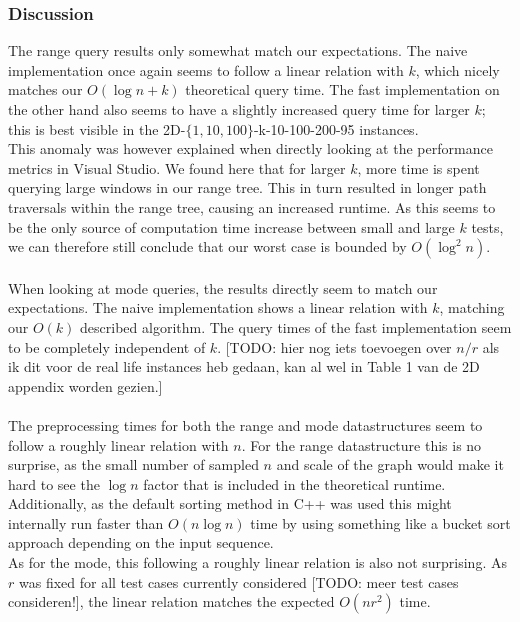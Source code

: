\documentclass{article}
\newcommand{\todo}[1]{{\color{red}[#1]}}
\newcommand{\fb}[1]{{\color{blue}#1}}
\begin{document}
\subsubsection*{Discussion}
The range query results only somewhat match our expectations. The naive implementation once again seems to follow a linear relation with $k$, which nicely matches our $O(\log n + k)$ theoretical query time. The fast implementation on the other hand also seems to have a slightly increased query time for larger $k$; \fb{this is best visible in the 2D-$\{1,10,100\}$-k-10-100-200-95 instances}. \\
This anomaly was however explained when directly looking at the performance metrics in Visual Studio. We found here that for larger $k$, more time is spent querying large windows in our range tree. This in turn resulted in longer path traversals within the range tree, causing an increased runtime. \fb{As this seems to be the only source of computation time increase between small and large $k$ tests, we can therefore still conclude that our worst case is bounded by $O(\log^2 n)$.} \\\\
When looking at mode queries, the results directly seem to match our expectations. The naive implementation shows a linear relation with $k$, matching our $O(k)$ described algorithm. The query times of the fast implementation seem to be completely independent of $k$. \todo{TODO: hier nog iets toevoegen over $n/r$ als ik dit voor de real life instances heb gedaan, kan al wel in Table 1 van de 2D appendix worden gezien.} \\\\
The preprocessing times for both the range and mode datastructures seem to follow a roughly linear relation with $n$. For the range datastructure this is no surprise, as the small number of sampled $n$ and scale of the graph would make it hard to see the $\log n$ factor that is included in the theoretical runtime. Additionally, as the default sorting method in C++ was used this might internally run faster than $O(n \log n)$ time by using something like a bucket sort approach depending on the input sequence. \\
As for the mode, this following a roughly linear relation is also not surprising. As $r$ was fixed for all test cases currently considered \todo{TODO: meer test cases consideren!}, the linear relation matches the expected \fb{$O(nr^2)$} time.
\end{document}

